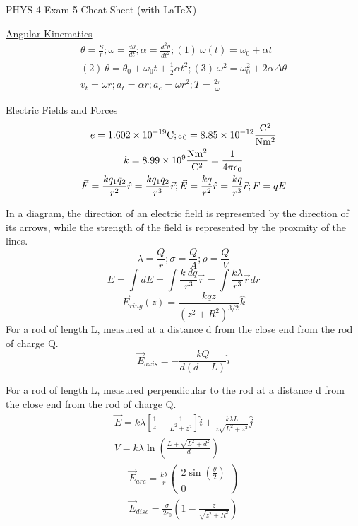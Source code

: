 \documentclass[8pt]{minimal}
\begin{document}
\twocolumn
PHYS 4 Exam 5 Cheat Sheet (with \LaTeX)

\underline{Angular Kinematics}
\begin{gather*}
    \theta = \frac{S}{r}; \omega = \frac{d\theta}{dt}; \alpha = \frac{d^2\theta}{dt^2}; (1)\ \omega(t) = \omega_0 + \alpha t\\
    (2)\ \theta = \theta_0 + \omega_0t + \frac{1}{2}\alpha t^2; (3)\ \omega^2 = \omega_0^2 + 2\alpha\Delta\theta\\
    v_t = \omega r; a_t = \alpha r; a_c = \omega r^2; T = \frac{2 \pi}{\omega}
\end{gather*}

\underline{Electric Fields and Forces}
\begin{gather*}
    e = 1.602 \times 10^{-19} \unit{\coulomb}; \varepsilon_0 = 8.85 \times 10^{-12} \unit{\frac{\coulomb^2}{\newton\meter^2}}\\
    k = 8.99 \times 10^9 \unit{\frac{\newton\meter^2}{\coulomb^2}}= \frac{1}{4\pi\epsilon_0}\\
    \vec{F} = \frac{kq_1q_2}{r^2}\hat{r} = \frac{kq_1q_2}{r^3}\vec{r};
    \vec{E} = \frac{kq}{r^2}\hat{r} = \frac{kq}{r^3}\vec{r}; F = qE
\end{gather*}

In a diagram, the direction of an electric field is represented by the direction of its arrows, while the strength of the field is represented by the proxmity of the lines.
\[\lambda = \frac{Q}{r} ; \sigma = \frac{Q}{A} ; \rho = \frac{Q}{V}\]
\[E = \int dE = \int \frac{k\ dq}{r^3}\vec{r} = \int \frac{k \lambda}{r^3}\vec{r}dr\]
\[ \vec{E}_{ring}(z) = \frac{kqz}{(z^2 + R^2)^{3/2}}\hat{k} \]
For a rod of length L, measured at a distance d from the close end from the rod of charge Q.
\[ \vec{E}_{axis} = -\frac{kQ}{d(d-L)}\hat{i} \]

For a rod of length L, measured perpendicular to the rod at a distance d from the close end from the rod of charge Q.
\begin{gather*}
    \vec{E} = k\lambda \left[ \frac{1}{z} - \frac{1}{L^2 + z^2} \right]\hat{i} + \frac{k\lambda L}{z\sqrt{L^2 + z^2}} \hat{j}\\
    V = k\lambda\ln\left(\frac{L + \sqrt{L^2 + d^2}}{d}\right)
\end{gather*}
\begin{gather*}
    \vec{E}_{arc} = \frac{k\lambda}{r} \begin{pmatrix}2\sin(\frac{\theta}{2})\\0\end{pmatrix}\\
    \vec{E}_{disc} = \frac{\sigma}{2\epsilon_0} \left(1 - \frac{z}{\sqrt{z^2 + R^2}}\right)
\end{gather*}
\end{document}
